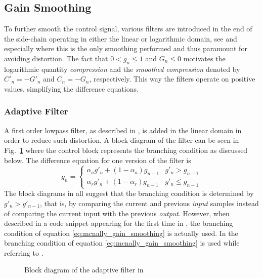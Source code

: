 \documentclass[../main2.tex]{subfiles}
\providecommand{\rootdir}{..}
\begin{document}
\FloatBarrier
\subsection{Gain Smoothing}
To further smooth the control signal, various filters are introduced in the end of the side-chain operating in either the linear or logarithmic domain, see \cite{mcnally1984dynamic}\cite{frindle1996implementation} and especially \cite{reiss2012tutorial} where this is the only smoothing performed and thus paramount for avoiding distortion. The fact that $0< g_n\leq 1$ and $G_n \leq 0$ motivates the logarithmic quantity \emph{compression} and the \emph{smoothed compression}  denoted by $C'_n = -G'_n$ and  $C_n = -G_n$, respectively. This way the filters operate on positive values, simplifying the difference equations.
\subsubsection{Adaptive Filter} \label{adaptive_filter}
A first order lowpass filter, as described in \cite{mcnally1984}, is added in the linear domain in order to reduce such distortion. A block diagram of the filter can be seen in Fig.~\ref{fig:block_mcnally_theory_adap_filter} where the control block represents the branching condition as discussed below. The difference equation for one version of the filter is
\begin{equation}
g_n = \begin{cases}
    \alpha_{a} g'_n + (1-\alpha_{a}) g_{n-1} 	& g'_n > g_{n-1} \\
    \alpha_{r} g'_n + (1-\alpha_{r}) g_{n-1} 	& g'_n \leq g_{n-1}
\end{cases}
\label{eq:mcnally_gain_smoothing}
\end{equation}
The block diagrams in \cite{mcnally1984dynamic}\cite{dafx02}\cite{dafx11}\cite{zolzer1997digital}\cite{zolzer2008digital} all suggest that the branching condition is determined by $g'_n > g'_{n-1}$, that is, by comparing the current and previous \emph{input} samples instead of comparing the current input with the previous \emph{output}. However, when described in a code snippet appearing for the first time in \cite{dafx11}, the branching condition of equation \eqref{eq:mcnally_gain_smoothing} is actually used. In \cite{bitzer2006parameter} the branching condition of equation \eqref{eq:mcnally_gain_smoothing} is used while referring to \cite{mcnally1984dynamic}\cite{dafx02}.
\begin{figure}
\centerline{}
\caption{Block diagram of the adaptive filter in \cite{mcnally1984dynamic}}
\label{fig:block_mcnally_theory_adap_filter}
\end{figure}
\end{document}
